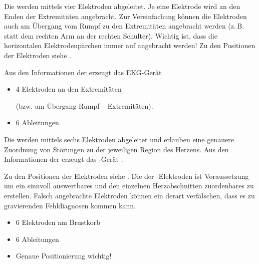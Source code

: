 {
Die  werden mittels vier
Elektroden abgeleitet. Je eine Elektrode wird an den Enden der
Extremitäten angebracht. Zur Vereinfachung können die
Elektroden auch am Übergang vom Rumpf zu den Extremitäten
angebracht werden (z.\,B. statt dem rechten Arm an der
rechten Schulter). Wichtig ist, dass die horizontalen Elektrodenpärchen
immer auf  angebracht werden!
%
Zu den Positionen der Elektroden siehe .

Aus den Informationen der  erzeugt das
EKG-Gerät  
}{
\begin{itemize}
  \item 4 Elektroden an den Extremitäten
  
  (bzw. am Übergang Rumpf -- Extremitäten).
  \item 6 Ableitungen.
\end{itemize}
}{}{}{}



{%
Die  werden mittels sechs Elektroden
abgeleitet und erlauben eine genauere Zuordnung von
Störungen zu der jeweiligen Region des Herzens. 
%
Aus den Informationen der  erzeugt das
-Gerät . 
%

Zu den Positionen der Elektroden siehe .
Die  der
-Elektroden ist Voraussetzung um ein
sinnvoll auswertbares und den einzelnen
Herzabschnitten zuordenbares  zu erstellen.
Falsch angebrachte Elektroden können ein  derart
verfälschen, dass es zu gravierenden Fehldiagnosen kommen
kann. 
\hfill{}

}{
\begin{itemize}
    \item 6 Elektroden am Brustkorb
    \item 6 Ableitungen
    \item Genaue Positionierung wichtig!
\end{itemize}
}{}{}{}

